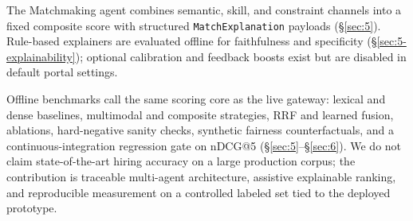 The Matchmaking agent combines semantic, skill, and constraint channels into a fixed composite score with structured \texttt{MatchExplanation} payloads (\S\ref{sec:5}).
Rule-based explainers are evaluated offline for faithfulness and specificity (\S\ref{sec:5-explainability}); optional calibration and feedback boosts exist but are disabled in default portal settings.

Offline benchmarks call the same scoring core as the live gateway: lexical and dense baselines, multimodal and composite strategies, RRF and learned fusion, ablations, hard-negative sanity checks, synthetic fairness counterfactuals, and a continuous-integration regression gate on nDCG@5 (\S\ref{sec:5}--\S\ref{sec:6}).
We do not claim state-of-the-art hiring accuracy on a large production corpus; the contribution is traceable multi-agent architecture, assistive explainable ranking, and reproducible measurement on a controlled labeled set tied to the deployed prototype.
